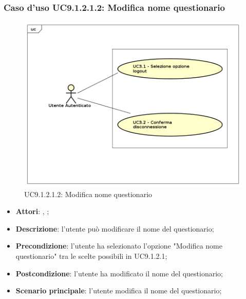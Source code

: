 					\subsubsection{Caso d'uso UC9.1.2.1.2: Modifica nome questionario}
					\label{UC9.1.2.1.2}
					\begin{figure}[h]
						\centering
					\includegraphics[scale=0.5,keepaspectratio]{UML/UC9.png}
						\caption{UC9.1.2.1.2: Modifica nome questionario}
					\end{figure}
					\FloatBarrier
					\begin{itemize}
						\item \textbf{Attori}: \uau, \uaupro;
						\item \textbf{Descrizione}: l'utente può modificare il nome del questionario; 
						\item \textbf{Precondizione}: l'utente ha selezionato l'opzione "Modifica nome questionario" tra le scelte possibili in UC9.1.2.1;
						\item \textbf{Postcondizione}: l'utente ha modificato il nome del questionario; 
						\item \textbf{Scenario principale}: l'utente modifica il nome del questionario;
					\end{itemize}
					

